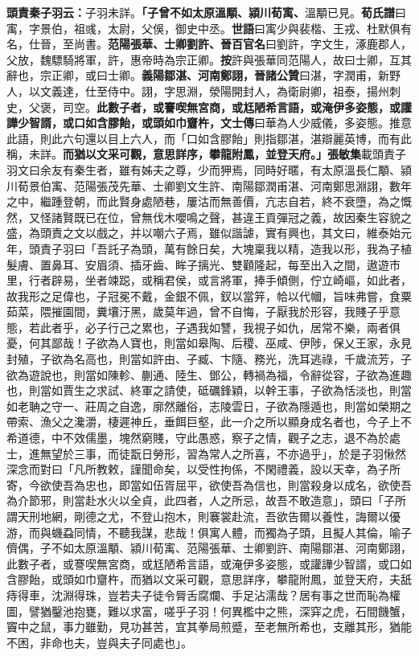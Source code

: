 \textbf{頭責秦子羽云：}{\footnotesize 子羽未詳。}\textbf{「子曾不如太原溫顒、潁川荀㝢、}{\footnotesize 溫顒已見。\textbf{荀氏譜}曰㝢，字景伯，祖彧，太尉，父俁，御史中丞。\textbf{世語}曰㝢少與裴楷、王戎、杜默俱有名，仕晉，至尚書。}\textbf{范陽張華、士卿劉許、}{\footnotesize \textbf{晉百官名}曰劉許，字文生，涿鹿郡人，父放，魏驃騎將軍，許，惠帝時為宗正卿。\textbf{按}許與張華同范陽人，故曰士卿，互其辭也，宗正卿，或曰士卿。}\textbf{義陽鄒湛、河南鄭詡，}{\footnotesize \textbf{晉諸公贊}曰湛，字潤甫，新野人，以文義達，仕至侍中。詡，字思淵，滎陽開封人，為衛尉卿，祖泰，揚州刺史，父褒，司空。}\textbf{此數子者，或謇喫無宮商，或尪陋希言語，或淹伊多姿態，或讙譁少智諝，或口如含膠飴，或頭如巾齏杵，}{\footnotesize \textbf{文士傳}曰華為人少威儀，多姿態。推意此語，則此六句還以目上六人，而「口如含膠飴」則指鄒湛，湛辯麗英博，而有此稱，未詳。}\textbf{而猶以文采可觀，意思詳序，攀龍附鳳，並登天府。」}{\footnotesize \textbf{張敏集}載頭責子羽文曰余友有秦生者，雖有姊夫之尊，少而狎焉，同時好暱，有太原溫長仁顒、潁川荀景伯㝢、范陽張茂先華、士卿劉文生許、南陽鄒潤甫湛、河南鄭思淵詡，數年之中，繼踵登朝，而此賢身處陋巷，屢沽而無善價，亢志自若，終不衰墮，為之慨然，又怪諸賢既已在位，曾無伐木嚶鳴之聲，甚違王貢彈冠之義，故因秦生容貌之盛，為頭責之文以戲之，并以嘲六子焉，雖似諧謔，實有興也，其文曰，維泰始元年，頭責子羽曰「吾託子為頭，萬有餘日矣，大塊稟我以精，造我以形，我為子植髮膚、置鼻耳、安眉須、插牙齒、眸子摛光、雙顴隆起，每至出入之間，遨遊市里，行者辟易，坐者竦跽，或稱君侯，或言將軍，捧手傾側，佇立崎嶇，如此者，故我形之足偉也，子冠冕不戴，金銀不佩，釵以當笄，帢以代幗，旨味弗嘗，食粟茹菜，隈摧園間，糞壤汙黑，歲莫年過，曾不自悔，子厭我於形容，我賤子乎意態，若此者乎，必子行己之累也，子遇我如讐，我視子如仇，居常不樂，兩者俱憂，何其鄙哉！子欲為人寶也，則當如皋陶、后稷、巫咸、伊陟，保乂王家，永見封殖，子欲為名高也，則當如許由、子臧、卞隨、務光，洗耳逃祿，千歲流芳，子欲為遊說也，則當如陳軫、蒯通、陸生、鄧公，轉禍為福，令辭從容，子欲為進趣也，則當如賈生之求試、終軍之請使，砥礪鋒穎，以幹王事，子欲為恬淡也，則當如老聃之守一、莊周之自逸，廓然離俗，志陵雲日，子欲為隱遁也，則當如榮期之帶索、漁父之瀺灂，棲遲神丘，垂餌巨壑，此一介之所以顯身成名者也，今子上不希道德，中不效儒墨，塊然窮賤，守此愚惑，察子之情，觀子之志，退不為於處士，進無望於三事，而徒翫日勞形，習為常人之所喜，不亦過乎」，於是子羽愀然深念而對曰「凡所教敕，謹聞命矣，以受性拘係，不閑禮義，設以天幸，為子所寄，今欲使吾為忠也，即當如伍胥屈平，欲使吾為信也，則當殺身以成名，欲使吾為介節邪，則當赴水火以全貞，此四者，人之所忌，故吾不敢造意」，頭曰「子所謂天刑地網，剛德之尤，不登山抱木，則褰裳赴流，吾欲告爾以養性，誨爾以優游，而與蟣蝨同情，不聽我謀，悲哉！俱寓人體，而獨為子頭，且擬人其倫，喻子儕偶，子不如太原溫顒、潁川荀㝢、范陽張華、士卿劉許、南陽鄒湛、河南鄭詡，此數子者，或謇喫無宮商，或尪陋希言語，或淹伊多姿態，或讙譁少智諝，或口如含膠飴，或頭如巾齏杵，而猶以文采可觀，意思詳序，攀龍附鳳，並登天府，夫舐痔得車，沈淵得珠，豈若夫子徒令脣舌腐爛、手足沾濡哉？居有事之世而恥為權圖，譬猶鑿池抱甕，難以求富，嗟乎子羽！何異檻中之熊，深穽之虎，石間饑蟹，竇中之鼠，事力雖勤，見功甚苦，宜其拳局煎蹙，至老無所希也，支離其形，猶能不困，非命也夫，豈與夫子同處也」。}

